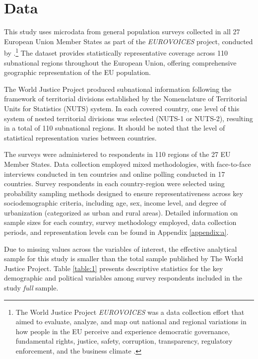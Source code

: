 \documentclass{article}
\begin{document}
\section{Data}

This study uses microdata from general population surveys collected in all 27 European Union Member States as part of the \emph{EUROVOICES} project, conducted by \textcite{the_world_justice_project}.\footnote{The World Justice Project \emph{EUROVOICES} was a data collection effort that aimed to evaluate, analyze, and map out national and regional variations in how people in the EU perceive and experience democratic governance, fundamental rights, justice, safety, corruption, transparency, regulatory enforcement, and the business climate \parencite{the_world_justice_project}.} The dataset provides statistically representative coverage across 110 subnational regions throughout the European Union, offering comprehensive geographic representation of the EU population.

The World Justice Project produced subnational information following the framework of territorial divisions established by the Nomenclature of Territorial Units for Statistics (NUTS) system. In each covered country, one level of this system of nested territorial divisions was selected (NUTS-1 or NUTS-2), resulting in a total of 110 subnational regions. It should be noted that the level of statistical representation varies between countries.

The surveys were administered to respondents in 110 regions of the 27 EU Member States. Data collection employed mixed methodologies, with face-to-face interviews conducted in ten countries and online polling conducted in 17 countries. Survey respondents in each country-region were selected using probability sampling methods designed to ensure representativeness across key sociodemographic criteria, including age, sex, income level, and degree of urbanization (categorized as urban and rural areas). Detailed information on sample sizes for each country, survey methodology employed, data collection periods, and representation levels can be found in Appendix \ref{appendix:a}.

Due to missing values across the variables of interest, the effective analytical sample for this study is smaller than the total sample published by The World Justice Project. Table \ref{table:1} presents descriptive statistics for the key demographic and political variables among survey respondents included in the study \emph{full} sample.
\end{document}
